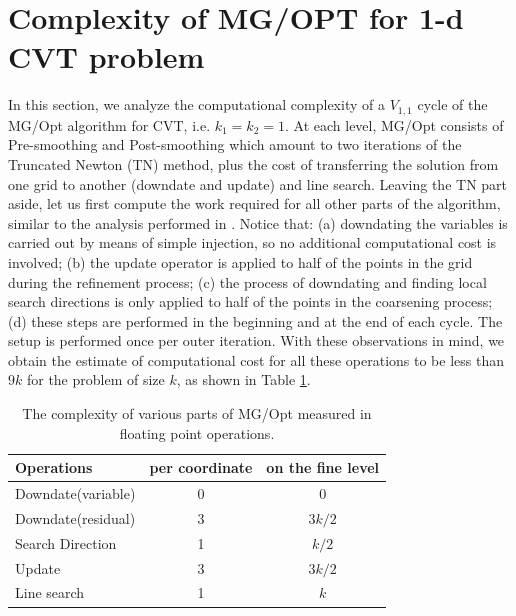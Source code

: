 \documentclass{siamltex}
\begin{document}
\section{Complexity of MG/OPT for 1-d CVT problem}
In this section, we analyze the computational complexity of a $V_{1,1}$ cycle of the MG/Opt algorithm for CVT, i.e.  $k_1=k_2=1$. At each level, MG/Opt consists of Pre-smoothing and Post-smoothing which amount to two iterations of the Truncated Newton (TN) method, plus the cost of transferring the solution from one grid to another (downdate and update) and line search. Leaving the TN part aside, let us first compute the work required for all other parts of the algorithm, similar to the analysis performed in \cite{NaNo91a}. Notice that: (a) downdating the variables is carried out by means of simple injection, so no additional computational cost is involved; (b) the update operator is applied to half of the points in the grid %
during the refinement process; (c) the process of downdating and finding local search directions is only applied to half of the points in the coarsening process; (d) these steps are performed in the beginning and at the end of each cycle. The setup is performed once per outer iteration. With these observations in mind, we obtain the estimate of computational cost for all these operations to be less than $9k$ for the problem of size $k$,  as shown in Table \ref{mgcom}.

\begin{table}
\begin{center}
\begin{tabular}{|l||c|c||} \hline
Operations &per coordinate& on the fine level\\ \hline
Downdate(variable)&0&0\\ \hline
Downdate(residual)&3&$3k/2$\\ \hline
Search Direction&1&$k/2$\\ \hline
Update&3&$3k/2$\\ \hline
Line search&1&$k$\\ \hline
 \end{tabular}
\end{center}
\caption{The complexity of various parts of MG/Opt measured in floating point operations.}
\label{mgcom}
\end{table}
\end{document}
